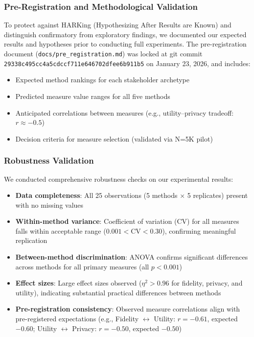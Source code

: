 \documentclass[12pt,a4paper]{article}
\begin{document}
\subsubsection{Pre-Registration and Methodological Validation}

To protect against HARKing (Hypothesizing After Results are Known) and distinguish confirmatory from exploratory findings, we documented our expected results and hypotheses prior to conducting full experiments. The pre-registration document (\texttt{docs/pre\_registration.md}) was locked at git commit \texttt{29338c495cc4a5cdccf711e646702dfee6b911b5} on January 23, 2026, and includes:

\begin{itemize}
    \item Expected method rankings for each stakeholder archetype
    \item Predicted measure value ranges for all five methods
    \item Anticipated correlations between measures (e.g., utility--privacy tradeoff: $r \approx -0.5$)
    \item Decision criteria for measure selection (validated via N=5K pilot)
\end{itemize}

\subsubsection{Robustness Validation}

We conducted comprehensive robustness checks on our experimental results:

\begin{itemize}
    \item \textbf{Data completeness}: All 25 observations (5 methods $\times$ 5 replicates) present with no missing values
    \item \textbf{Within-method variance}: Coefficient of variation (CV) for all measures falls within acceptable range ($0.001 < \text{CV} < 0.30$), confirming meaningful replication
    \item \textbf{Between-method discrimination}: ANOVA confirms significant differences across methods for all primary measures (all $p < 0.001$)
    \item \textbf{Effect sizes}: Large effect sizes observed ($\eta^2 > 0.96$ for fidelity, privacy, and utility), indicating substantial practical differences between methods
    \item \textbf{Pre-registration consistency}: Observed measure correlations align with pre-registered expectations (e.g., Fidelity $\leftrightarrow$ Utility: $r = -0.61$, expected $-0.60$; Utility $\leftrightarrow$ Privacy: $r = -0.50$, expected $-0.50$)
\end{itemize}
\end{document}
